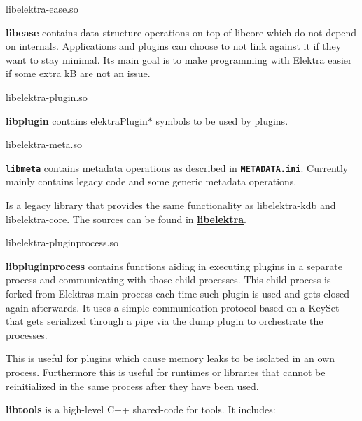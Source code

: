 \begin{DoxyCode}
libelektra-ease.so
\end{DoxyCode}


{\bfseries libease} contains data-\/structure operations on top of libcore which do not depend on internals. Applications and plugins can choose to not link against it if they want to stay minimal. Its main goal is to make programming with Elektra easier if some extra kB are not an issue.


\begin{DoxyCode}
libelektra-plugin.so
\end{DoxyCode}


{\bfseries libplugin} contains {\ttfamily elektra\+Plugin$\ast$} symbols to be used by plugins.


\begin{DoxyCode}
libelektra-meta.so
\end{DoxyCode}


{\bfseries \href{/home/jenkins/workspace/libelektra-release/src/libs/meta/meta.c}{\tt libmeta}} contains metadata operations as described in {\bfseries \href{/home/jenkins/workspace/libelektra-release/doc/METADATA.ini}{\tt M\+E\+T\+A\+D\+A\+T\+A.\+ini}}. Currently mainly contains legacy code and some generic metadata operations.

Is a legacy library that provides the same functionality as {\ttfamily libelektra-\/kdb} and {\ttfamily libelektra-\/core}. The sources can be found in {\bfseries \hyperlink{md_src_libs_elektra_README_src_libs_elektra_README_md}{libelektra}}.


\begin{DoxyCode}
libelektra-pluginprocess.so
\end{DoxyCode}


{\bfseries libpluginprocess} contains functions aiding in executing plugins in a separate process and communicating with those child processes. This child process is forked from Elektra\textquotesingle{}s main process each time such plugin is used and gets closed again afterwards. It uses a simple communication protocol based on a Key\+Set that gets serialized through a pipe via the dump plugin to orchestrate the processes.

This is useful for plugins which cause memory leaks to be isolated in an own process. Furthermore this is useful for runtimes or libraries that cannot be reinitialized in the same process after they have been used.

{\bfseries libtools} is a high-\/level C++ shared-\/code for tools. It includes\+:


